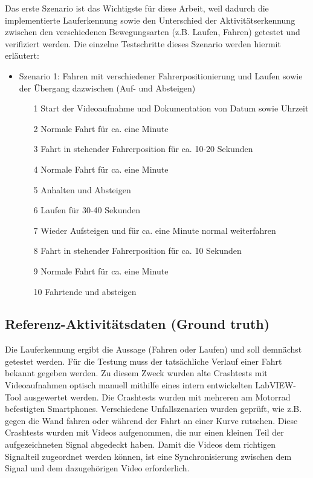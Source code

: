 Das erste Szenario ist das Wichtigste für diese Arbeit, weil dadurch die implementierte Lauferkennung sowie den Unterschied der Aktivitätserkennung zwischen den verschiedenen Bewegungsarten (z.B. Laufen, Fahren) getestet und verifiziert werden. Die einzelne Testschritte dieses Szenario werden hiermit erläutert:
\begin{itemize}
	\item Szenario 1: Fahren mit verschiedener Fahrerpositionierung und Laufen sowie der Übergang dazwischen (Auf- und Absteigen)
	\begin{itemize}
		\item[1] Start der Videoaufnahme und Dokumentation von Datum sowie Uhrzeit
		\item[2] Normale Fahrt für ca. eine Minute
		\item[3] Fahrt in stehender Fahrerposition für ca. 10-20 Sekunden
		\item[4] Normale Fahrt für ca. eine Minute
		\item[5] Anhalten und Absteigen
		\item[6] Laufen für 30-40 Sekunden
		\item[7] Wieder Aufsteigen und für ca. eine Minute normal weiterfahren
		\item[8] Fahrt in stehender Fahrerposition für ca. 10 Sekunden
		\item[9] Normale Fahrt für ca. eine Minute
		\item[10] Fahrtende und absteigen
	\end{itemize}
\end{itemize}

\subsection{Referenz-Aktivitätsdaten (Ground truth)} %

Die Lauferkennung ergibt die Aussage (Fahren oder Laufen) und soll demnächst getestet werden. Für die Testung muss der tatsächliche Verlauf einer Fahrt bekannt gegeben werden. Zu diesem Zweck wurden alte Crashtests mit Videoaufnahmen optisch manuell mithilfe eines intern entwickelten LabVIEW-Tool ausgewertet werden. Die Crashtests wurden mit mehreren am Motorrad befestigten Smartphones. Verschiedene Unfallszenarien wurden geprüft, wie z.B. gegen die Wand fahren oder während der Fahrt an einer Kurve rutschen. Diese Crashtests wurden mit Videos aufgenommen, die nur einen kleinen Teil der aufgezeichneten Signal abgedeckt haben. Damit die Videos dem richtigen Signalteil zugeordnet werden können, ist eine Synchronisierung zwischen dem Signal und dem dazugehörigen Video erforderlich. 

